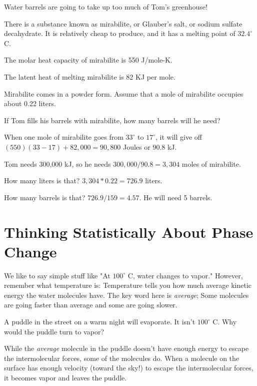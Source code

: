 \begin{Exercise}[title=Using Mirabilite For Thermal Energy Storage, label=mirabilite]

Water barrels are going to take up too much of Tom's greenhouse!

There is a substance known as mirabilite, or Glauber's salt,  or sodium sulfate decahydrate.  It is relatively cheap to produce, and it has a melting point of $32.4^\circ$ C.

The molar heat capacity of mirabilite is 550 J/mole-K.

The latent heat of melting mirabilite is 82 KJ per mole.

Mirabilite comes in a powder form.  Assume that a mole of mirabilite occupies about 0.22 liters.

If Tom fills his barrels with mirabilite,  how many barrels will he need?

\end{Exercise}
\begin{Answer}[ref=mirabilite] 

When one mole of mirabilite goes from $33^\circ$ to $17^\circ$,  it will give off $(550)(33-17) + 82,000 = 90,800$ Joules or $90.8$ kJ. 

Tom needs 300,000 kJ,  so he needs $300,000/90.8 =   3,304$ moles of mirabilite.

How many liters is that?  $3,304 * 0.22 = 726.9$ liters.

How many barrels is that? $726.9 / 159 = 4.57$.  He will need 5 barrels.
  
\end{Answer}

\section{Thinking Statistically About Phase Change}

We like to say simple stuff like "At $100^\circ$ C,  water changes to vapor." However,  remember what
temperature is: Temperature tells you how much average kinetic energy the water molecules have.   The key word here is \emph{average}; Some molecules are going faster than average and some are going slower.

A puddle in the street on a warm night will evaporate.   It isn't  $100^\circ$ C.  Why would the puddle turn to vapor?

While the \emph{average} molecule in the puddle doesn't have enough energy to escape the intermolecular forces,  some of the molecules do.  When a molecule on the surface has enough velocity (toward the sky!) to escape the intermolecular forces,  it becomes vapor and leaves the puddle.


